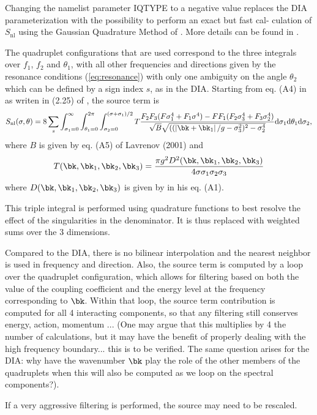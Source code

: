 \noindent
Changing the namelist parameter IQTYPE to a negative value replaces the
DIA parameterization with the possibility to perform an exact but fast cal-
culation of $S_{\mathrm{nl}}$ using the Gaussian Quadrature Method of \cite{Lavrenov2001}.
More details can be found in \cite{Gagnaire-Renou2009}.


The quadruplet configurations that are used correspond to the three integrals over $f_1$, $f_2$ and $\theta_1$, with all other frequencies and directions given by the resonance conditions (\ref{eq:resonance}) with only one ambiguity on the angle $\theta_2$ which can be defined by a sign index $s$, as in the DIA.  Starting from eq. (A4) in \cite{Lavrenov2001} as writen in (2.25) of \cite{Gagnaire-Renou2009}, the source term is 
\begin{equation}
S_{\mathrm{nl}}(\sigma,\theta) =  8 \sum_s \int_{\sigma_1=0}^\infty \int_{\theta_1=0}^{2 \pi} \int_{\sigma_2=0}^{(\sigma+\sigma_1)/2}  T  \frac{F_2 F_3 (F \sigma_1^4 + F_1 \sigma^4) - F F_1 (F_2 \sigma_3^4 + F_3 \sigma_2^4)}{\sqrt{B}\sqrt{((\left| \bk+\bk_1 \right|/g- \sigma_3^2)^2-\sigma_2^4} } {\mathrm d}\sigma_1 {\mathrm d}\theta_1 {\mathrm d}\sigma_2 ,
      \label{eq:snl_gqm}
\end{equation}
where $B$ is given by eq. (A5) of Lavrenov (2001) and  
\begin{equation}
T(\bk,\bk_1,\bk_2,\bk_3) = \frac{\pi g^2 D^2(\bk,\bk_1,\bk_2,\bk_3) }{4 \sigma \sigma_1 \sigma_2 \sigma_3}
\end{equation}
where $ D(\bk,\bk_1,\bk_2,\bk_3)$ is given by \cite{Webb1978} in his eq. (A1). 

This triple integral is performed using quadrature functions to best resolve the effect of the singularities in the denominator. It is thus replaced with weighted sums over the 3 dimensions. 

Compared to the DIA, there is no bilinear interpolation and the nearest neighbor is used in frequency and direction. Also, 
the source term is computed by a loop over the quadruplet configuration, which allows for filtering based on 
both the value of the coupling coefficient and the energy level at the frequency corresponding to $\bk$. Within 
that loop, the source term contribution is computed for all 4 interacting components, so that any filtering still 
conserves energy, action, momentum ... (One may argue that this multiplies by 4 the number of calculations, but it may have the benefit of properly dealing with the high frequency boundary... this is to be verified. The same question arises for the DIA: why have the wavenumber $\bk$ play the role of the other members of the quadruplets when this will also be computed as we loop on the spectral components?). 

If a very aggressive filtering is performed, the source may need to be rescaled.

